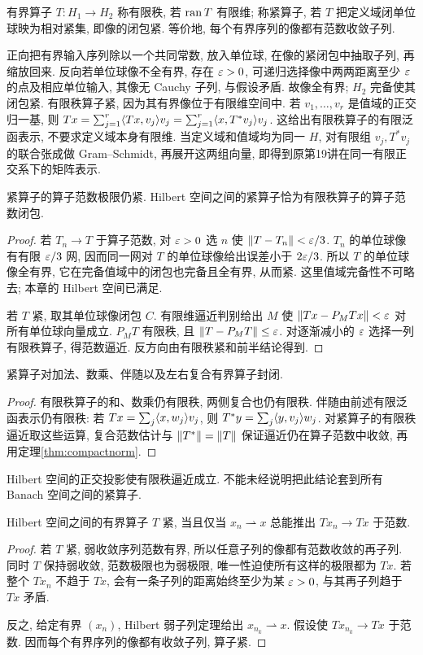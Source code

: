 \begin{definition}
有界算子 $T:H_1\to H_2$ 称有限秩, 若 $\operatorname{ran} T$ 有限维; 称紧算子, 若 $T$ 把定义域闭单位球映为相对紧集, 即像的闭包紧. 等价地, 每个有界序列的像都有范数收敛子列.
\end{definition}
正向把有界输入序列除以一个共同常数, 放入单位球, 在像的紧闭包中抽取子列, 再缩放回来. 反向若单位球像不全有界, 存在 $\varepsilon>0$, 可递归选择像中两两距离至少 $\varepsilon$ 的点及相应单位输入, 其像无 Cauchy 子列, 与假设矛盾. 故像全有界; $H_2$ 完备使其闭包紧. 有限秩算子紧, 因为其有界像位于有限维空间中. 若 $v_1,\ldots,v_r$ 是值域的正交归一基, 则
$Tx=\sum_{j=1}^r\langle Tx,v_j\rangle v_j=\sum_{j=1}^r\langle x,T^*v_j\rangle v_j$.
这给出有限秩算子的有限泛函表示, 不要求定义域本身有限维. 当定义域和值域均为同一 $H$, 对有限组 $v_j,T^*v_j$ 的联合张成做 Gram--Schmidt, 再展开这两组向量, 即得到原第19讲在同一有限正交系下的矩阵表示.

\begin{theorem}\label{thm:compactnorm}
紧算子的算子范数极限仍紧. Hilbert 空间之间的紧算子恰为有限秩算子的算子范数闭包.
\end{theorem}
\begin{proof}
若 $T_n\to T$ 于算子范数, 对 $\varepsilon>0$ 选 $n$ 使 $\lVert T-T_n\rVert<\varepsilon/3$. $T_n$ 的单位球像有有限 $\varepsilon/3$ 网, 因而同一网对 $T$ 的单位球像给出误差小于 $2\varepsilon/3$. 所以 $T$ 的单位球像全有界, 它在完备值域中的闭包也完备且全有界, 从而紧. 这里值域完备性不可略去; 本章的 Hilbert 空间已满足.

若 $T$ 紧, 取其单位球像闭包 $C$. 有限维逼近判别给出 $M$ 使 $\lVert Tx-P_MTx\rVert<\varepsilon$ 对所有单位球向量成立. $P_MT$ 有限秩, 且 $\lVert T-P_MT\rVert\le\varepsilon$. 对逐渐减小的 $\varepsilon$ 选择一列有限秩算子, 得范数逼近. 反方向由有限秩紧和前半结论得到.
\end{proof}

\begin{corollary}\label{cor:compactideal}
紧算子对加法、数乘、伴随以及左右复合有界算子封闭.
\end{corollary}
\begin{proof}
有限秩算子的和、数乘仍有限秩, 两侧复合也仍有限秩. 伴随由前述有限泛函表示仍有限秩: 若 $Tx=\sum_j\langle x,w_j\rangle v_j$, 则 $T^*y=\sum_j\langle y,v_j\rangle w_j$. 对紧算子的有限秩逼近取这些运算, 复合范数估计与 $\lVert T^*\rVert=\lVert T\rVert$ 保证逼近仍在算子范数中收敛, 再用定理\ref{thm:compactnorm}.
\end{proof}
Hilbert 空间的正交投影使有限秩逼近成立. 不能未经说明把此结论套到所有 Banach 空间之间的紧算子.

\begin{theorem}\label{thm:compactweak}
Hilbert 空间之间的有界算子 $T$ 紧, 当且仅当 $x_n\rightharpoonup x$ 总能推出 $Tx_n\to Tx$ 于范数.
\end{theorem}
\begin{proof}
若 $T$ 紧, 弱收敛序列范数有界, 所以任意子列的像都有范数收敛的再子列. 同时 $T$ 保持弱收敛, 范数极限也为弱极限, 唯一性迫使所有这样的极限都为 $Tx$. 若整个 $Tx_n$ 不趋于 $Tx$, 会有一条子列的距离始终至少为某 $\varepsilon>0$, 与其再子列趋于 $Tx$ 矛盾.

反之, 给定有界 $(x_n)$, Hilbert 弱子列定理给出 $x_{n_k}\rightharpoonup x$. 假设使 $Tx_{n_k}\to Tx$ 于范数. 因而每个有界序列的像都有收敛子列, 算子紧.
\end{proof}

